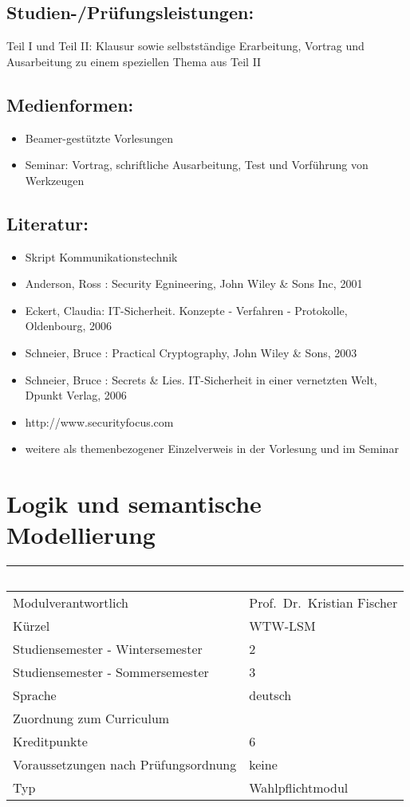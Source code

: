 \section*{Studien-/Prüfungsleistungen:}\label{studien-pruxfcfungsleistungen-25}

Teil I und Teil II: Klausur sowie selbstständige Erarbeitung, Vortrag
und Ausarbeitung zu einem speziellen Thema aus Teil II

\section*{Medienformen:}\label{medienformen-25}

\begin{itemize}
\item
  Beamer-gestützte Vorlesungen
\item
  Seminar: Vortrag, schriftliche Ausarbeitung, Test und Vorführung von
  Werkzeugen
\end{itemize}

\section*{Literatur:}\label{literatur-22}

\begin{itemize}
\item
  Skript Kommunikationstechnik
\item
  Anderson, Ross : Security Egnineering, John Wiley \& Sons Inc, 2001
\item
  Eckert, Claudia: IT-Sicherheit. Konzepte - Verfahren - Protokolle,
  Oldenbourg, 2006
\item
  Schneier, Bruce : Practical Cryptography, John Wiley \& Sons, 2003
\item
  Schneier, Bruce : Secrets \& Lies. IT-Sicherheit in einer vernetzten
  Welt, Dpunkt Verlag, 2006
\item
  http://www.securityfocus.com
\item
  weitere als themenbezogener Einzelverweis in der Vorlesung und im
  Seminar
\end{itemize}

\chapter{Logik und semantische
Modellierung}\label{logik-und-semantische-modellierung}

\begin{longtable}[]{@{}ll@{}}
\toprule
~ & ~\tabularnewline
\midrule
\endhead
Modulverantwortlich & Prof.~Dr.~Kristian Fischer\tabularnewline
Kürzel & WTW-LSM\tabularnewline
Studiensemester - Wintersemester & 2\tabularnewline
Studiensemester - Sommersemester & 3\tabularnewline
Sprache & deutsch\tabularnewline
Zuordnung zum Curriculum & ~\tabularnewline
Kreditpunkte & 6\tabularnewline
Voraussetzungen nach Prüfungsordnung & keine\tabularnewline
Typ & Wahlpflichtmodul\tabularnewline
\bottomrule
\end{longtable}

